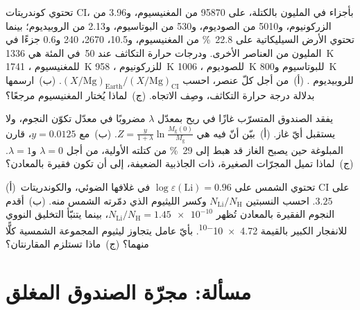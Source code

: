 \begin{exercise}[$\star\star\star$]\label{exo:b3:origin-of-elements:10}
تحتوي كوندريتات CI، بأجزاء في المليون بالكتلة، على \num{95870}
من المغنيسيوم، و\num{3.96} من الزركونيوم، و\num{5010} من الصوديوم، و\num{530}
من البوتاسيوم، و\num{2.13} من الروبيديوم؛ بينما تحتوي الأرض السيليكاتية على
\qty{22.8}{\percent} من المغنيسيوم، و\num{10.5}، \num{2670}، \num{240}
و\num{0.6} جزءًا في المليون من العناصر الأخرى. ودرجات حرارة التكاثف عند 50~في المئة
هي \qty{1336}{K} للمغنيسيوم ، \qty{1741}{K} للزركونيوم ،
\qty{958}{K} للصوديوم ، \qty{1006}{K} للبوتاسيوم  و\qty{800}{K} للروبيديوم . (أ)~من أجل
كلّ عنصر، احسب $(X/\mathrm{Mg})_\mathrm{Earth}/(X/\mathrm{Mg})_\mathrm{CI}$.
(ب)~ارسمها بدلالة درجة حرارة التكاثف، وصِف
الاتجاه. (ج)~لماذا يُختار المغنيسيوم مرجعًا؟
\end{exercise}

\begin{exercise}[$\star\star\star$]\label{exo:b3:origin-of-elements:11}
يفقد الصندوق المتسرّب غازًا في ريح بمعدّل $\lambda$ مضروبًا في معدّل
تكوّن النجوم، ولا يستقبل أيّ غاز. (أ)~بيّن أنّ  فيه هي
$Z = \frac{y}{1 + \lambda}\ln\frac{M_\mathrm{g}(0)}{M_\mathrm{g}}$.
(ب)~مع $y = 0.0125$، قارن  المبلوغة حين يصبح الغاز قد
هبط إلى \qty{29}{\percent} من كتلته الأولية، من أجل $\lambda = 0$
و$\lambda = 1$. (ج)~لماذا تميل المجرّات الصغيرة، ذات الجاذبية الضعيفة، إلى أن تكون
فقيرة بالمعادن؟
\end{exercise}

\begin{exercise}[$\star\star\star$]\label{exo:b3:origin-of-elements:12}
(أ)~تحتوي الشمس على $\log\varepsilon(\mathrm{Li}) = 0.96$ في غلافها الضوئي، والكوندريتات CI على $3.25$. احسب النسبتين $N_\mathrm{Li}/N_\mathrm{H}$
وكسر الليثيوم الذي دمّرته الشمس منه. (ب)~أقدم
النجوم الفقيرة بالمعادن تُظهر $N_\mathrm{Li}/N_\mathrm{H} = \num{1.45e-10}$،
بينما يتنبّأ التخليق النووي للانفجار الكبير بالقيمة \num{4.72e-10}. بأيّ عامل
يتجاوز ليثيوم المجموعة الشمسية كلًّا منهما؟ (ج)~ماذا
تستلزم
المقارنتان؟
\end{exercise}

\section{مسألة: مجرّة الصندوق المغلق}

